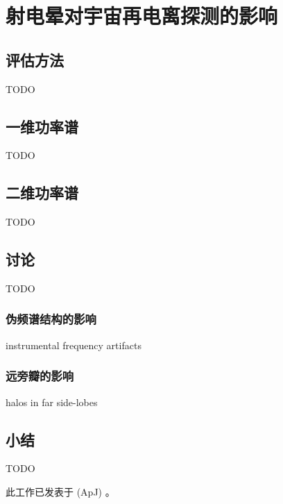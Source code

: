 
\chapter{射电晕对宇宙再电离探测的影响}
\label{chap:halo}

\section{评估方法}

TODO


\section{一维功率谱}

TODO


\section{二维功率谱}

TODO


\section{讨论}

TODO

\subsection{伪频谱结构的影响}

instrumental frequency artifacts

\subsection{远旁瓣的影响}

halos in far side-lobes


\section{小结}

TODO

此工作已发表于 \apj{} (ApJ) \cite{li.halo}。


